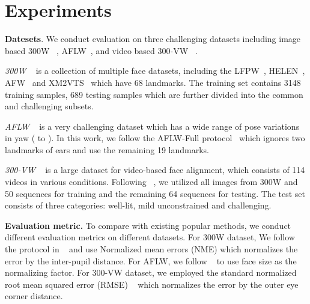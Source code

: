 \documentclass[10pt,twocolumn,letterpaper]{article}
\begin{document}
{{		\section{Experiments}
\textbf{Datesets}. We conduct evaluation on three challenging
		datasets including image based 300W ~\cite{Sagonas2013A}, AFLW~\cite{koestinger2011annotated}, 
		and video based 300-VW ~\cite{shen2015first, tzimiropoulos2015project, chrysos2015offline}. 
		
		\emph{300W} ~\cite{Sagonas2013A} is a collection of multiple face datasets, including the LFPW~\cite{Belhumeur2011Localizing}, HELEN~\cite{Le2012Interactive}, AFW~\cite{Ramanan2012Face} and XM2VTS~\cite{Messer2000XM2VTS} which have 68 landmarks.
The training set contains 3148 training samples, 689 testing samples which are further divided into the common and 
		challenging subsets.
		
		\emph{AFLW} ~\cite{koestinger2011annotated} is a very challenging dataset which has a wide range of pose variations in yaw
		( to ). In this work, we follow the AFLW-Full protocol~\cite{zhu2016unconstrained} which 
		ignores two landmarks of ears and use the remaining 19 landmarks. 
		
		\emph{300-VW} ~\cite{shen2015first, tzimiropoulos2015project, chrysos2015offline} is a large dataset for video-based face 
		alignment, which consists of 114 videos in various conditions.  Following ~\cite{shen2015first}, we utilized all images 
		from 300W and 50 sequences for training and the remaining 64 sequences for testing. The test set 
		consists of three categories: well-lit, mild unconstrained and challenging. 
		
		\textbf{Evaluation metric.} 
		To compare with existing popular methods, we conduct different evaluation metrics on different datasets.
		For 300W dataset, We follow the protocol in ~\cite{ren2016face} and use Normalized mean errors (NME) which 
		normalizes the error by the inter-pupil distance. For AFLW, we follow ~\cite{zhu2015face} to use face size as the normalizing factor. 
		For 300-VW dataset, we employed the standard normalized root mean squared error (RMSE) ~\cite{shen2015first} which normalizes the error by the outer eye corner distance. 
		
}}
\end{document}

